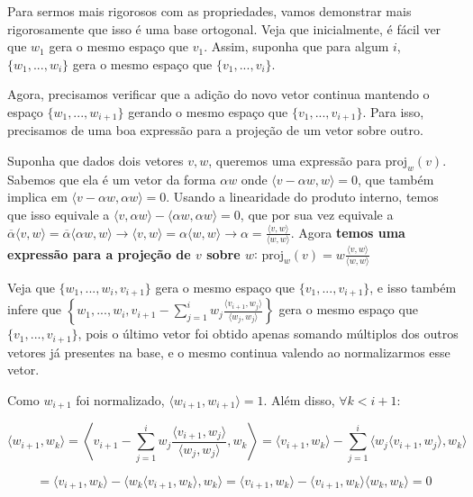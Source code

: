 \documentclass[11pt, a4paper]{article}
\begin{document}
Para sermos mais rigorosos com as propriedades, vamos demonstrar mais rigorosamente que isso é uma base ortogonal. Veja que inicialmente, é fácil ver que \(w_1\) gera o mesmo espaço que \(v_1\). Assim, suponha que para algum \(i\), \(\{w_1,...,w_i\}\) gera o mesmo espaço que \(\{v_1,...,v_i\}\).

Agora, precisamos verificar que a adição do novo vetor continua mantendo o espaço \(\{w_1,...,w_{i+1}\}\) gerando o mesmo espaço que \(\{v_1,...,v_{i+1}\}\). Para isso, precisamos de uma boa expressão para a projeção de um vetor sobre outro.

Suponha que dados dois vetores \(v,w\), queremos uma expressão para \(\text{proj}_w(v)\). Sabemos que ela é um vetor da forma \(\alpha w\) onde \(\langle v-\alpha w,w\rangle=0\), que também implica em \(\langle v-\alpha w, \alpha w\rangle=0\). Usando a linearidade do produto interno, temos que isso equivale a \(\langle v, \alpha w \rangle -\langle \alpha w,\alpha w\rangle=0\), que por sua vez equivale a \(\overline{\alpha}\langle v,w\rangle=\overline{\alpha}\langle \alpha w,w\rangle \rightarrow \langle v,w\rangle = \alpha \langle w,w \rangle \rightarrow \alpha = \frac{\langle v,w \rangle}{\langle w,w \rangle}\). Agora \textbf{temos uma expressão para a projeção de \(v\) sobre \(w\)}: \(\text{proj}_w(v)=w\frac{\langle v,w \rangle}{\langle w,w \rangle}\)

\void[0.2]

Veja que \(\{w_1,...,w_i,v_{i+1}\}\) gera o mesmo espaço que \(\{v_1,...,v_{i+1}\}\), e isso também infere que \(\left\{w_1,...,w_i,v_{i+1}-\displaystyle\sum_{j=1}^{i}{w_j\frac{\langle v_{i+1},w_j \rangle}{\langle w_j,w_j \rangle}}\right\}\) gera o mesmo espaço que \(\{v_1,...,v_{i+1}\}\), pois o último vetor foi obtido apenas somando múltiplos dos outros vetores já presentes na base, e o mesmo continua valendo ao normalizarmos esse vetor.

Como \(w_{i+1}\) foi normalizado, \(\langle w_{i+1},w_{i+1} \rangle=1\). Além disso, \(\forall k<i+1\):

\void[-0.8]

\[\langle w_{i+1},w_k\rangle=\left\langle v_{i+1}-\sum_{j=1}^{i}{w_j\frac{\langle v_{i+1},w_j \rangle}{\langle w_j,w_j \rangle}},w_k\right\rangle=\langle v_{i+1},w_k\rangle -\sum_{j=1}^i{\langle w_j\langle v_{i+1},w_j \rangle, w_k \rangle}\]

\void[-0.8]

\[=\langle v_{i+1},w_k\rangle-\langle w_k\langle v_{i+1},w_k\rangle,w_k \rangle = \langle v_{i+1},w_k \rangle - \langle v_{i+1},w_k \rangle\langle w_k,w_k \rangle = 0\]
\end{document}
